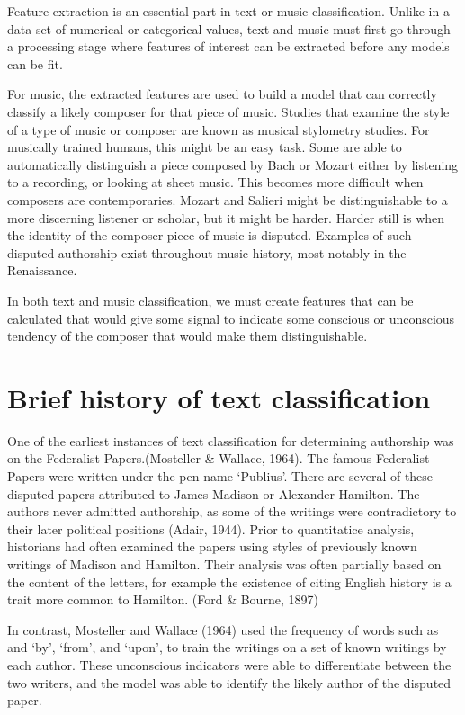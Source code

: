 \documentclass[12pt,twoside]{reedthesis}
\theoremstyle{definition}
\theoremstyle{definition}
\theoremstyle{definition}
\theoremstyle{remark}
\begin{document}
Feature extraction is an essential part in text or music classification.
Unlike in a data set of numerical or categorical values, text and music
must first go through a processing stage where features of interest can
be extracted before any models can be fit.

For music, the extracted features are used to build a model that can
correctly classify a likely composer for that piece of music. Studies
that examine the style of a type of music or composer are known as
musical stylometry studies. For musically trained humans, this might be
an easy task. Some are able to automatically distinguish a piece
composed by Bach or Mozart either by listening to a recording, or
looking at sheet music. This becomes more difficult when composers are
contemporaries. Mozart and Salieri might be distinguishable to a more
discerning listener or scholar, but it might be harder. Harder still is
when the identity of the composer piece of music is disputed. Examples
of such disputed authorship exist throughout music history, most notably
in the Renaissance.

In both text and music classification, we must create features that can
be calculated that would give some signal to indicate some conscious or
unconscious tendency of the composer that would make them
distinguishable.

\section{Brief history of text
classification}\label{brief-history-of-text-classification}

One of the earliest instances of text classification for determining
authorship was on the Federalist Papers.(Mosteller \& Wallace, 1964).
The famous Federalist Papers were written under the pen name `Publius'.
There are several of these disputed papers attributed to James Madison
or Alexander Hamilton. The authors never admitted authorship, as some of
the writings were contradictory to their later political positions
(Adair, 1944). Prior to quantitatice analysis, historians had often
examined the papers using styles of previously known writings of Madison
and Hamilton. Their analysis was often partially based on the content of
the letters, for example the existence of citing English history is a
trait more common to Hamilton. (Ford \& Bourne, 1897)

In contrast, Mosteller and Wallace (1964) used the frequency of words
such as and `by', `from', and `upon', to train the writings on a set of
known writings by each author. These unconscious indicators were able to
differentiate between the two writers, and the model was able to
identify the likely author of the disputed paper.
\end{document}
